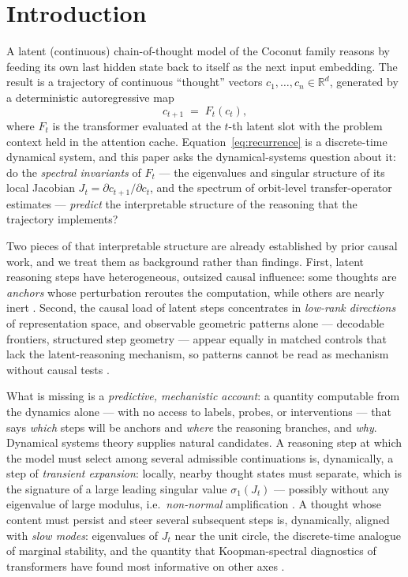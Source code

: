 \documentclass[11pt]{article}
\newcommand{\cthought}[1]{c_{#1}}
\newcommand{\Jt}{J_t}
\newcommand{\sigmaone}{\sigma_1}
\begin{document}
\section{Introduction}

A latent (continuous) chain-of-thought model of the Coconut family
\citep{hao2024coconut} reasons by feeding its own last hidden state back to itself as the
next input embedding. The result is a trajectory of continuous ``thought'' vectors
$\cthought{1},\dots,\cthought{n}\in\mathbb{R}^{d}$, generated by a deterministic
autoregressive map
\begin{equation}
  \cthought{t+1} \;=\; F_t(\cthought{t}),
  \label{eq:recurrence}
\end{equation}
where $F_t$ is the transformer evaluated at the $t$-th latent slot with the problem
context held in the attention cache. Equation~\eqref{eq:recurrence} is a discrete-time
dynamical system, and this paper asks the dynamical-systems question about it: do the
\emph{spectral invariants} of $F_t$ --- the eigenvalues and singular structure of its local
Jacobian $\Jt = \partial \cthought{t+1}/\partial \cthought{t}$, and the spectrum of
orbit-level transfer-operator estimates --- \emph{predict} the interpretable structure of
the reasoning that the trajectory implements?

Two pieces of that interpretable structure are already established by prior causal work,
and we treat them as background rather than findings. First, latent reasoning steps have
heterogeneous, outsized causal influence: some thoughts are \emph{anchors} whose
perturbation reroutes the computation, while others are nearly inert
\citep{li2026dynamics}. Second, the causal load of latent steps concentrates in
\emph{low-rank directions} of representation space, and observable geometric patterns
alone --- decodable frontiers, structured step geometry --- appear equally in matched
controls that lack the latent-reasoning mechanism, so patterns cannot be read as
mechanism without causal tests \citep{aswal2026observable}.

What is missing is a \emph{predictive, mechanistic account}: a quantity computable from
the dynamics alone --- with no access to labels, probes, or interventions --- that says
\emph{which} steps will be anchors and \emph{where} the reasoning branches, and
\emph{why}. Dynamical systems theory supplies natural candidates. A reasoning step at
which the model must select among several admissible continuations is, dynamically, a
step of \emph{transient expansion}: locally, nearby thought states must separate, which
is the signature of a large leading singular value $\sigmaone(\Jt)$ --- possibly without
any eigenvalue of large modulus, i.e.\ \emph{non-normal} amplification
\citep{trefethen1993hydro,trefethen2005spectra}. A thought whose content must persist
and steer several subsequent steps is, dynamically, aligned with \emph{slow modes}:
eigenvalues of $\Jt$ near the unit circle, the discrete-time analogue of marginal
stability, and the quantity that Koopman-spectral diagnostics of transformers have found
most informative on other axes \citep{kim2026rksp}.
\end{document}
